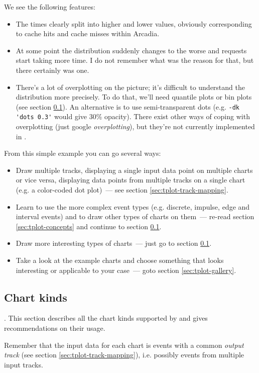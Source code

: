\documentclass{article}
\begin{document}
We see the following features:
\begin{itemize}
\item The times clearly split into higher and lower values, obviously corresponding to cache hits and cache misses within Arcadia.
\item At some point the distribution suddenly changes to the worse and requests start taking more time. I do not remember what was the reason for that, but there certainly was one.
\item There's a lot of overplotting on the picture; it's difficult to understand the distribution more precisely. To do that, we'll need quantile plots or bin plots (see section \ref{sec:tplot-chart-kinds}). An alternative is to use semi-transparent dots (e.g. \verb|-dk 'dots 0.3'| would give 30\% opacity). There exist other ways of coping with overplotting (just google \emph{overplotting}), but they're not currently implemented in \timeplot{}.
\end{itemize}

From this simple example you can go several ways:
\begin{itemize}
\item Draw multiple tracks, displaying a single input data point on multiple charts or vice versa, displaying data points from multiple tracks on a single chart (e.g. a color-coded dot plot)~--- see section \ref{sec:tplot-track-mapping}.
\item Learn to use the more complex event types (e.g. discrete, impulse, edge and interval events) and to draw other types of charts on them~--- re-read section \ref{sec:tplot-concepts} and continue to section \ref{sec:tplot-chart-kinds}.
\item Draw more interesting types of charts~--- just go to section \ref{sec:tplot-chart-kinds}.
\item Take a look at the example charts and choose something that looks interesting or applicable to your case~--- goto section \ref{sec:tplot-gallery}.
\end{itemize}

\subsection{Chart kinds}
\label{sec:tplot-chart-kinds}.
This section describes all the chart kinds supported by \timeplot{} and gives recommendations on their usage.

Remember that the input data for each chart is events with a common \emph{output track} (see section \ref{sec:tplot-track-mapping}), i.e. possibly events from multiple input tracks.
\end{document}
